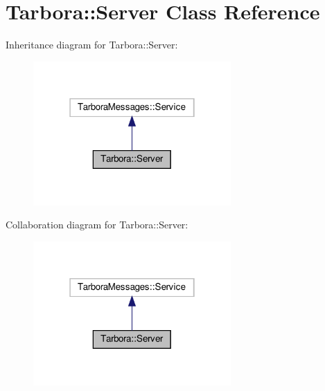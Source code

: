 \hypertarget{classTarbora_1_1Server}{}\section{Tarbora\+:\+:Server Class Reference}
\label{classTarbora_1_1Server}


Inheritance diagram for Tarbora\+:\+:Server\+:
\nopagebreak
\begin{figure}[H]
\begin{center}
\leavevmode
\includegraphics[width=214pt]{classTarbora_1_1Server__inherit__graph}
\end{center}
\end{figure}


Collaboration diagram for Tarbora\+:\+:Server\+:
\nopagebreak
\begin{figure}[H]
\begin{center}
\leavevmode
\includegraphics[width=214pt]{classTarbora_1_1Server__coll__graph}
\end{center}
\end{figure}
